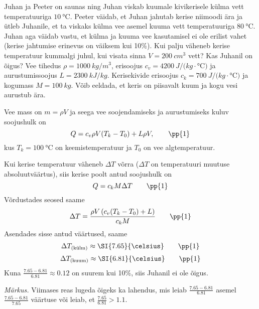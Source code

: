\setAuthor{}

Juhan ja Peeter on saunas ning Juhan viskab kuumale kivikerisele külma vett temperatuuriga $\SI{10}{\celsius}$. Peeter väidab, et Juhan jahutab kerise niimoodi ära ja ütleb Juhanile, et ta viskaks külma vee asemel kuuma vett temperatuuriga $\SI{80}{\celsius}$. Juhan aga väidab vastu, et külma ja kuuma vee kasutamisel ei ole erilist vahet (kerise jahtumise erinevus on väiksem kui 10\%). Kui palju väheneb kerise temperatuur kummalgi juhul, kui visata sinna $V=\SI{200}{cm^3}$ vett? Kas Juhanil on õigus? Vee tihedus $\rho=\SI{1000}{kg/m^3}$, erisoojus $c_v=\SI{4200}{J/(kg\cdot\celsius)}$ ja aurustumissoojus $L=\SI{2300}{kJ/kg}$. Kerisekivide erisoojus $c_k=\SI{700}{J/(kg\cdot\celsius)}$ ja kogumass $M=\SI{100}{kg}$. Võib eeldada, et keris on piisavalt kuum ja kogu vesi aurustub ära. 

\hint

\solu
Vee mass on $m=\rho V$ ja seega vee soojendamiseks ja aurustumiseks kuluv soojushulk on
$$Q=c_v\rho V (T_k-T_0) + L\rho V, \qquad\pp{1}$$
kus $T_k = \SI{100}{\celsius}$ on keemistemperatuur ja $T_0$ on vee algtemperatuur.

Kui kerise temperatuur väheneb $\Delta T$ võrra ($\Delta T$ on temperatuuri muutuse absoluutväärtus), siis kerise poolt antud soojushulk on
$$Q=c_kM\Delta T \qquad \pp{1}$$
Võrdustades seosed saame
$$\Delta T = \frac{\rho V\left(c_v(T_k-T_0)+L\right)}{c_kM} \qquad\pp{1}$$
Asendades sisse antud väärtused, saame
$$\Delta T_{\text{(külm)}}\approx \SI{7.65}{\celsius} \qquad\pp{1}$$
$$\Delta T_{\text{(kuum)}}\approx \SI{6.81}{\celsius} \qquad\pp{1}$$
Kuna $\frac{\num{7.65}-\num{6.81}}{\num{6.81}}\approx \num{0.12}$  on suurem kui 10\%, siis Juhanil ei ole õigus. 

\emph{Märkus.} Viimases reas lugeda õigeks ka lahendus, mis leiab $\frac{\num{7.65}-\num{6.81}}{\num{6.81}}$ asemel $\frac{\num{7.65}-\num{6.81}}{\num{7.65}}$ väärtuse või leiab, et $\frac{\num{7.65}}{\num{6.81}}>\num{1.1}$.
\probend